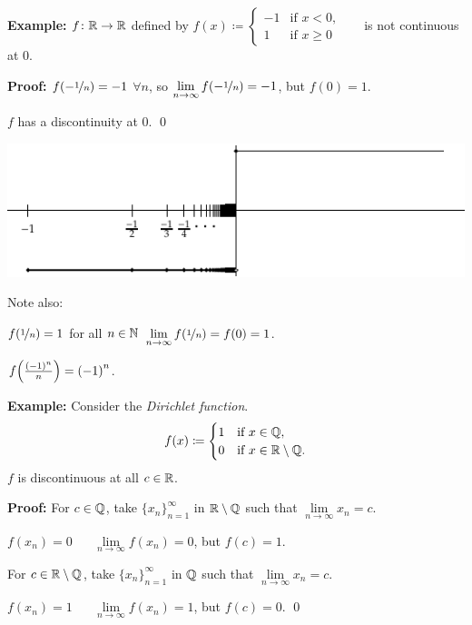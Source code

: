 \documentclass[10pt,aspectratio=169]{beamer}
\begin{document}
\begin{frame}

\textbf{Example:}
$f \colon {\mathbb{R}} \to {\mathbb{R}}$ defined by
$f(x) \coloneqq 
\begin{cases}
-1 & \text{if } x < 0, \\
1 & \text{if } x \geq 0
\end{cases}$
~~ is not continuous at 0.

\pause
\medskip

\textbf{Proof:} $f(-\nicefrac{1}{n}) = -1$ $\forall n$, so
$\lim\limits_{n\to\infty} f(-\nicefrac{1}{n}) = -1$, but $f(0) = 1$.

\pause
\thus \quad $f$ has a discontinuity at $0$. \qed

\pause
\medskip

\begin{center}
\includegraphics{../figures/jumpdiscont}
\end{center}

\pause
\medskip

Note also:

\medskip

$f(\nicefrac{1}{n}) = 1$ for all $n \in {\mathbb{N}}$ \wthus $\lim\limits_{n\to\infty} f(\nicefrac{1}{n}) = f(0) = 1$.

\pause
\medskip

$f\Bigl(\frac{{(-1)}^n}{n}\Bigr) = {(-1)}^n$.
\end{frame}

\begin{frame}

\textbf{Example:}
Consider the \emph{Dirichlet function}.
\begin{equation*}
f(x) \coloneqq
\begin{cases}
1 & \text{if } x \in {\mathbb{Q}} , \\
0 & \text{if } x \in {\mathbb{R}} \setminus {\mathbb{Q}} .
\end{cases}
\end{equation*}
\pause
$f$ is discontinuous at all $c \in {\mathbb{R}}$.

\pause
\medskip

\textbf{Proof:}
For $c \in {\mathbb{Q}}$, take $\{ x_n \}_{n=1}^\infty$ in ${\mathbb{R}} \setminus {\mathbb{Q}}$ such that $\lim\limits_{n\to\infty} x_n = c$.

\pause
$f(x_n) = 0$ ~\thus~ $\lim\limits_{n\to\infty} f(x_n) = 0$,
\quad but $f(c) = 1$.

\pause
\medskip

For $c \in {\mathbb{R}} \setminus {\mathbb{Q}}$, take $\{ x_n \}_{n=1}^\infty$ in ${\mathbb{Q}}$ such that
$\lim\limits_{n\to\infty} x_n = c$.

\pause
$f(x_n) = 1$ ~\thus~ $\lim\limits_{n\to\infty} f(x_n) = 1$,
\quad but $f(c) = 0$.
\qed

\end{frame}
\end{document}
